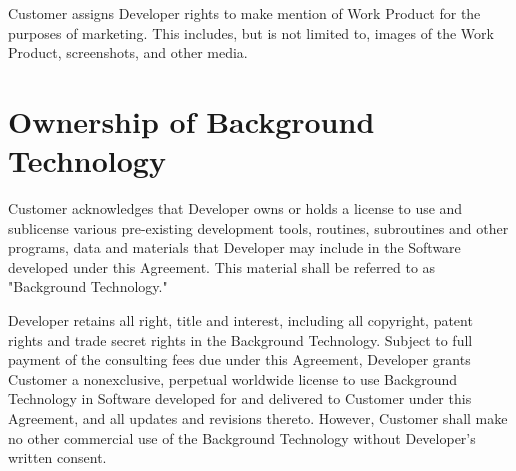 \documentclass[11pt]{article}
\begin{document}
Customer assigns Developer rights to make mention of Work Product for the purposes of marketing. This includes, but is not limited to, images of the Work Product, screenshots, and other media.
\section{Ownership of Background Technology}
Customer acknowledges that Developer owns or holds a license to use and sublicense various pre-existing development tools, routines, subroutines and other programs, data and materials that Developer may include in the Software developed under this Agreement. This material shall be referred to as "Background Technology."  

Developer retains all right, title and interest, including all copyright, patent rights and trade secret rights in the Background Technology. Subject to full payment of the consulting fees due under this Agreement, Developer grants Customer a nonexclusive, perpetual worldwide license to use Background Technology in Software developed for and delivered to Customer under this Agreement, and all updates and revisions thereto. However, Customer shall make no other commercial use of the Background Technology without Developer’s written consent.
\end{document}
